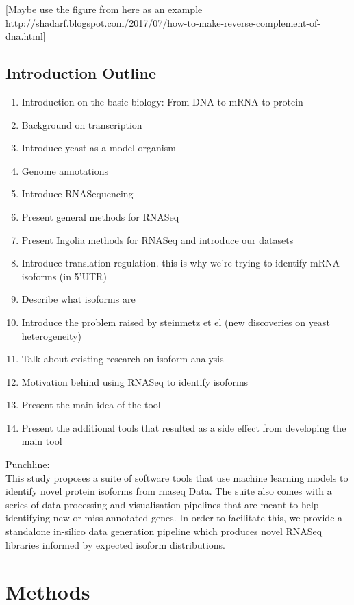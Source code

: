 \documentclass[12pt]{article}
\begin{document}
[Maybe use the figure from here as an example http://shadarf.blogspot.com/2017/07/how-to-make-reverse-complement-of-dna.html]


\subsection{Introduction Outline}
\begin{enumerate}
    \item Introduction on the basic biology: From DNA to mRNA to protein
    \item Background on transcription 
    \item Introduce yeast as a model organism
    \item Genome annotations
    \item Introduce RNASequencing
    \item Present general methods for RNASeq
    \item Present Ingolia methods for RNASeq and introduce our datasets
    \item Introduce translation regulation. this is why we're trying to identify mRNA isoforms (in 5'UTR)
    \item Describe what isoforms are 
    \item Introduce the problem raised by steinmetz et el (new discoveries on yeast heterogeneity) 
    \item Talk about existing research on isoform analysis 
    \item Motivation behind using RNASeq to identify isoforms
    \item Present the main idea of the tool
    \item Present  the additional tools that resulted as a side effect from developing the main tool

\end{enumerate}

Punchline: \\

This study proposes a suite of software tools that use machine learning models to identify novel protein isoforms from \gls{rnaseq} Data. The suite also comes with a series of data processing and visualisation pipelines that are meant to help identifying new or miss annotated genes. In order to facilitate this, we provide a standalone in-silico data generation pipeline which produces novel RNASeq libraries informed by expected isoform distributions. 

\section{Methods}
\end{document}
